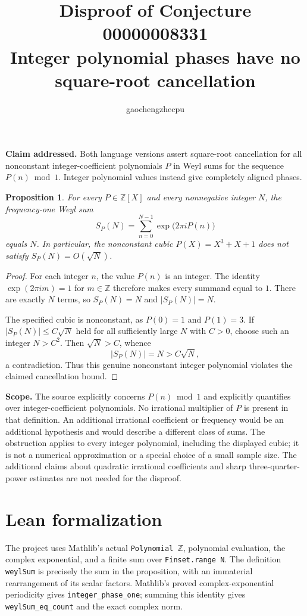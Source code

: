 \documentclass[11pt]{article}
\title{Disproof of Conjecture 00000008331\\Integer polynomial phases have no square-root cancellation}
\author{gaochengzhecpu}
\date{}
\newtheorem{proposition}{Proposition}
\begin{document}
\maketitle
\noindent\textbf{Claim addressed.} Both language versions assert square-root cancellation for all nonconstant integer-coefficient polynomials $P$ in Weyl sums for the sequence $P(n)\bmod1$. Integer polynomial values instead give completely aligned phases.

\begin{proposition}
For every $P\in\mathbb Z[X]$ and every nonnegative integer $N$, the frequency-one Weyl sum
\[
 S_P(N)=\sum_{n=0}^{N-1}\exp\bigl(2\pi iP(n)\bigr)
\]
equals $N$. In particular, the nonconstant cubic $P(X)=X^3+X+1$ does not satisfy $S_P(N)=O(\sqrt N)$.
\end{proposition}
\begin{proof}
For each integer $n$, the value $P(n)$ is an integer. The identity $\exp(2\pi i m)=1$ for $m\in\mathbb Z$ therefore makes every summand equal to $1$. There are exactly $N$ terms, so $S_P(N)=N$ and $|S_P(N)|=N$.

The specified cubic is nonconstant, as $P(0)=1$ and $P(1)=3$. If $|S_P(N)|\leq C\sqrt N$ held for all sufficiently large $N$ with $C>0$, choose such an integer $N>C^2$. Then $\sqrt N>C$, whence
\[
 |S_P(N)|=N>C\sqrt N,
\]
a contradiction. Thus this genuine nonconstant integer polynomial violates the claimed cancellation bound.
\end{proof}

\noindent\textbf{Scope.} The source explicitly concerns $P(n)\bmod1$ and explicitly quantifies over integer-coefficient polynomials. No irrational multiplier of $P$ is present in that definition. An additional irrational coefficient or frequency would be an additional hypothesis and would describe a different class of sums. The obstruction applies to every integer polynomial, including the displayed cubic; it is not a numerical approximation or a special choice of a small sample size. The additional claims about quadratic irrational coefficients and sharp three-quarter-power estimates are not needed for the disproof.

\section*{Lean formalization}
The project uses Mathlib's actual \texttt{Polynomial $\mathbb Z$}, polynomial evaluation, the complex exponential, and a finite sum over \texttt{Finset.range N}. The definition \texttt{weylSum} is precisely the sum in the proposition, with an immaterial rearrangement of its scalar factors. Mathlib's proved complex-exponential periodicity gives \texttt{integer\_phase\_one}; summing this identity gives \texttt{weylSum\_eq\_count} and the exact complex norm.
\end{document}
